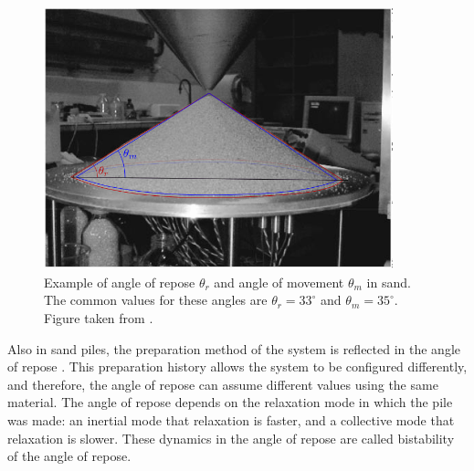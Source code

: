     \begin{figure}
        \centering
        \includegraphics[width=0.9\textwidth]{04-figuras/Sand_Pile_GG_Experiment_Angles.png}
        \caption[Angle of repose and angle of movement.]{Example of angle of repose $\theta _r$ and angle of movement $\theta _m$ in sand. The common values for these angles are $\theta _r = 33^{\circ}$ and $\theta _m = 35^{\circ}$. Figure taken from \cite{Memories_in_Sand}.}
        \label{fig:angulo_repouso}
    \end{figure}


    Also in sand piles, the preparation method of the system is reflected in the angle of repose \cite{Dynamics_at_the_angle_of_repose}. This preparation history allows the system to be configured differently, and therefore, the angle of repose can assume different values using the same material. The angle of repose depends on the relaxation mode in which the pile was made: an inertial mode that relaxation is faster, and a collective mode that relaxation is slower. These dynamics in the angle of repose are called bistability of the angle of repose.

